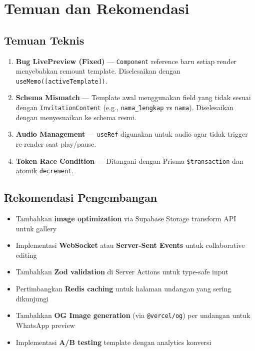 \documentclass[12pt,a4paper]{article}
\begin{document}
\section{Temuan dan Rekomendasi}

\subsection{Temuan Teknis}

\begin{enumerate}
  \item \textbf{Bug LivePreview (Fixed)} --- \texttt{Component} reference baru setiap render menyebabkan remount template. Diselesaikan dengan \texttt{useMemo([activeTemplate])}.
  \item \textbf{Schema Mismatch} --- Template awal menggunakan field yang tidak sesuai dengan \texttt{InvitationContent} (e.g., \texttt{nama\_lengkap} vs \texttt{nama}). Diselesaikan dengan menyesuaikan ke schema resmi.
  \item \textbf{Audio Management} --- \texttt{useRef} digunakan untuk audio agar tidak trigger re-render saat play/pause.
  \item \textbf{Token Race Condition} --- Ditangani dengan Prisma \texttt{\$transaction} dan atomik \texttt{decrement}.
\end{enumerate}

\subsection{Rekomendasi Pengembangan}

\begin{itemize}
  \item Tambahkan \textbf{image optimization} via Supabase Storage transform API untuk gallery
  \item Implementasi \textbf{WebSocket} atau \textbf{Server-Sent Events} untuk collaborative editing
  \item Tambahkan \textbf{Zod validation} di Server Actions untuk type-safe input
  \item Pertimbangkan \textbf{Redis caching} untuk halaman undangan yang sering dikunjungi
  \item Tambahkan \textbf{OG Image generation} (via \texttt{@vercel/og}) per undangan untuk WhatsApp preview
  \item Implementasi \textbf{A/B testing} template dengan analytics konversi
\end{itemize}
\end{document}
